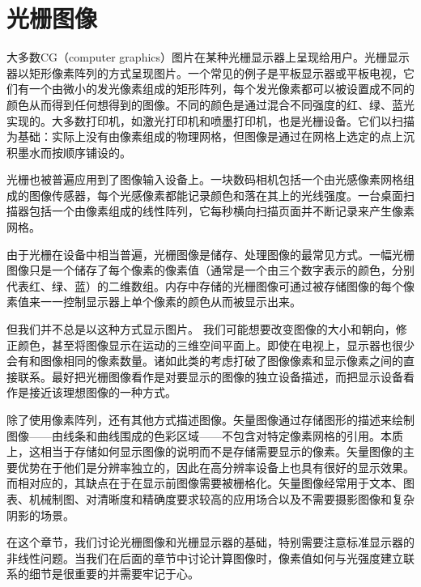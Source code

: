 \documentclass[lang=cn,12pt]{elegantbook}
\begin{document}
\chapter{光栅图像}
 
大多数CG（computer graphics）图片在某种光栅显示器上呈现给用户。光栅显示器以矩形像素阵列的方式呈现图片。一个常见的例子是平板显示器或平板电视，它们有一个由微小的发光像素组成的矩形阵列，每个发光像素都可以被设置成不同的颜色从而得到任何想得到的图像。不同的颜色是通过混合不同强度的红、绿、蓝光实现的。大多数打印机，如激光打印机和喷墨打印机，也是光栅设备。它们以扫描为基础：实际上没有由像素组成的物理网格，但图像是通过在网格上选定的点上沉积墨水而按顺序铺设的。



光栅也被普遍应用到了图像输入设备上。一块数码相机包括一个由光感像素网格组成的图像传感器，每个光感像素都能记录颜色和落在其上的光线强度。一台桌面扫描器包括一个由像素组成的线性阵列，它每秒横向扫描页面并不断记录来产生像素网格。

由于光栅在设备中相当普遍，光栅图像是储存、处理图像的最常见方式。一幅光栅图像只是一个储存了每个像素的像素值（通常是一个由三个数字表示的颜色，分别代表红、绿、蓝）的二维数组。内存中存储的光栅图像可通过被存储图像的每个像素值来一一控制显示器上单个像素的颜色从而被显示出来。


但我们并不总是以这种方式显示图片。 我们可能想要改变图像的大小和朝向，修正颜色，甚至将图像显示在运动的三维空间平面上。即使在电视上，显示器也很少会有和图像相同的像素数量。诸如此类的考虑打破了图像像素和显示像素之间的直接联系。最好把光栅图像看作是对要显示的图像的独立设备描述，而把显示设备看作是接近该理想图像的一种方式。

除了使用像素阵列，还有其他方式描述图像。矢量图像通过存储图形的描述来绘制图像——由线条和曲线围成的色彩区域——不包含对特定像素网格的引用。本质上，这相当于存储如何显示图像的说明而不是存储需要显示的像素。矢量图像的主要优势在于他们是分辨率独立的，因此在高分辨率设备上也具有很好的显示效果。而相对应的，其缺点在于在显示前图像需要被栅格化。矢量图像经常用于文本、图表、机械制图、对清晰度和精确度要求较高的应用场合以及不需要摄影图像和复杂阴影的场景。

在这个章节，我们讨论光栅图像和光栅显示器的基础，特别需要注意标准显示器的非线性问题。当我们在后面的章节中讨论计算图像时，像素值如何与光强度建立联系的细节是很重要的并需要牢记于心。
\end{document}
